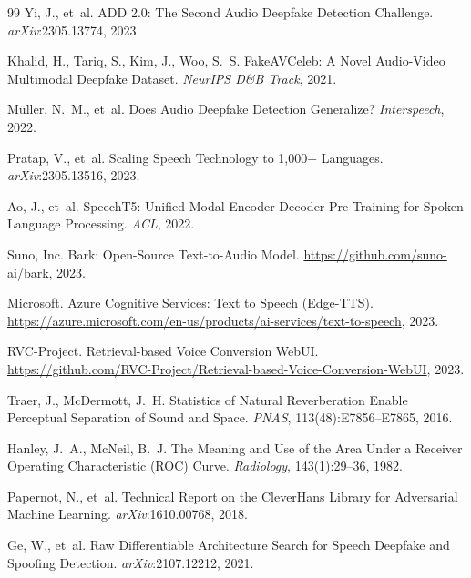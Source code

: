 \documentclass{article}
\begin{document}
\begin{thebibliography}{99}
Yi, J., et~al.
\newblock ADD 2.0: The Second Audio Deepfake Detection Challenge.
\newblock \textit{arXiv}:2305.13774, 2023.

Khalid, H., Tariq, S., Kim, J., Woo, S.~S.
\newblock FakeAVCeleb: A Novel Audio-Video Multimodal Deepfake Dataset.
\newblock \textit{NeurIPS D\&B Track}, 2021.

M{\"u}ller, N.~M., et~al.
\newblock Does Audio Deepfake Detection Generalize?
\newblock \textit{Interspeech}, 2022.

Pratap, V., et~al.
\newblock Scaling Speech Technology to 1,000+ Languages.
\newblock \textit{arXiv}:2305.13516, 2023.

Ao, J., et~al.
\newblock SpeechT5: Unified-Modal Encoder-Decoder Pre-Training for
  Spoken Language Processing.
\newblock \textit{ACL}, 2022.

Suno, Inc.
\newblock Bark: Open-Source Text-to-Audio Model.
\newblock \url{https://github.com/suno-ai/bark}, 2023.

Microsoft.
\newblock Azure Cognitive Services: Text to Speech (Edge-TTS).
\newblock \url{https://azure.microsoft.com/en-us/products/ai-services/text-to-speech}, 2023.

RVC-Project.
\newblock Retrieval-based Voice Conversion WebUI.
\newblock \url{https://github.com/RVC-Project/Retrieval-based-Voice-Conversion-WebUI}, 2023.

Traer, J., McDermott, J.~H.
\newblock Statistics of Natural Reverberation Enable Perceptual Separation of
  Sound and Space.
\newblock \textit{PNAS}, 113(48):E7856--E7865, 2016.

Hanley, J.~A., McNeil, B.~J.
\newblock The Meaning and Use of the Area Under a Receiver Operating
  Characteristic (ROC) Curve.
\newblock \textit{Radiology}, 143(1):29--36, 1982.

Papernot, N., et~al.
\newblock Technical Report on the CleverHans Library for Adversarial Machine
  Learning.
\newblock \textit{arXiv}:1610.00768, 2018.

Ge, W., et~al.
\newblock Raw Differentiable Architecture Search for Speech Deepfake and
  Spoofing Detection.
\newblock \textit{arXiv}:2107.12212, 2021.


\end{thebibliography}
\end{document}
